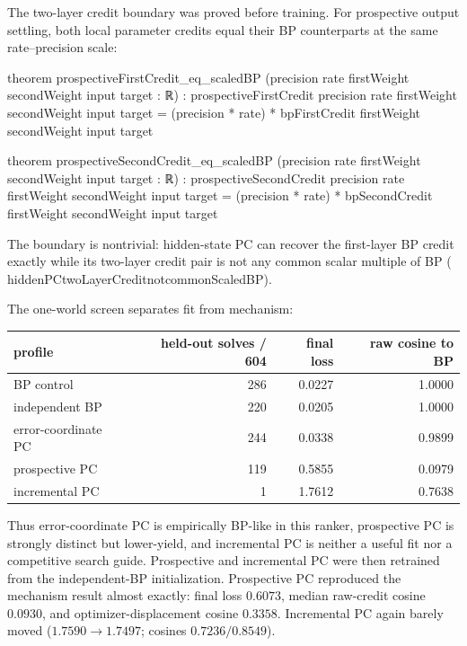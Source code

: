 \documentclass[11pt]{article}
\newcommand{\leanname}[1]{{\scriptsize\ttfamily
  \def\_{\textunderscore\allowbreak}#1}}
\begin{document}
The two-layer credit boundary was proved before training. For prospective output
settling, both local parameter credits equal their BP counterparts at the same
rate--precision scale:
\begin{leansignature}
theorem prospectiveFirstCredit_eq_scaledBP
    (precision rate firstWeight secondWeight input target : ℝ) :
  prospectiveFirstCredit precision rate firstWeight secondWeight input target =
    (precision * rate) * bpFirstCredit firstWeight secondWeight input target

theorem prospectiveSecondCredit_eq_scaledBP
    (precision rate firstWeight secondWeight input target : ℝ) :
  prospectiveSecondCredit precision rate firstWeight secondWeight input target =
    (precision * rate) * bpSecondCredit firstWeight secondWeight input target
\end{leansignature}
The boundary is nontrivial: hidden-state PC can recover the first-layer BP credit
exactly while its two-layer credit pair is not any common scalar multiple of BP
(\leanname{hiddenPC\_twoLayerCredit\_not\_commonScaledBP}).

The one-world screen separates fit from mechanism:

\begin{center}\small
\begin{tabular}{@{}lrrr@{}}
\toprule
profile & held-out solves / 604 & final loss & raw cosine to BP \\
\midrule
BP control & 286 & 0.0227 & 1.0000 \\
independent BP & 220 & 0.0205 & 1.0000 \\
error-coordinate PC & 244 & 0.0338 & 0.9899 \\
prospective PC & 119 & 0.5855 & 0.0979 \\
incremental PC & 1 & 1.7612 & 0.7638 \\
\bottomrule
\end{tabular}
\end{center}

Thus error-coordinate PC is empirically BP-like in this ranker, prospective PC is
strongly distinct but lower-yield, and incremental PC is neither a useful fit nor a
competitive search guide. Prospective and incremental PC were then retrained from the
independent-BP initialization. Prospective PC reproduced the mechanism result almost
exactly: final loss $0.6073$, median raw-credit cosine $0.0930$, and
optimizer-displacement cosine $0.3358$. Incremental PC again barely moved
($1.7590\to1.7497$; cosines $0.7236/0.8549$).
\end{document}
